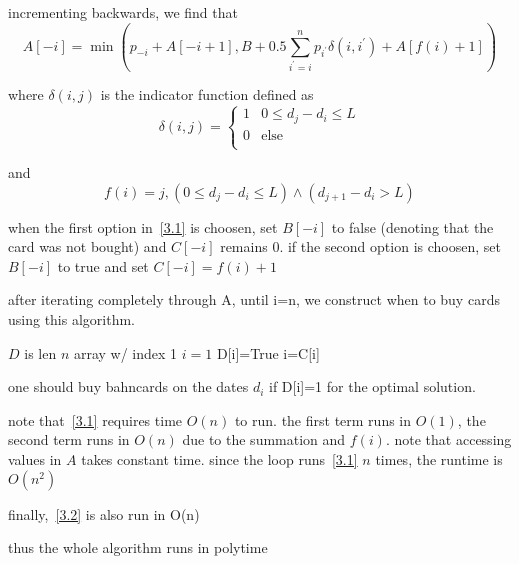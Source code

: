 \documentclass[letterpaper,12pt]{article}
\begin{document}
\begin{enumerate}
incrementing backwards, we find that 
\begin{equation}\label{3.1}
    A[-i] = \min\left(p_{-i}+A[-i+1],B+0.5\sum_{i^\prime = i}^{n}p_{i^\prime}\delta(i,i^\prime)+A[f(i)+1]\right)
\end{equation}

where \(\delta(i,j)\) is the indicator function defined as
\begin{equation}
    \delta(i,j)=\begin{cases}
        1 &0\leq d_j-d_i\leq L\\
        0& \text{else}\\
    \end{cases}
\end{equation}

and
\begin{equation}
    f(i) = j, (0\leq d_j-d_i\leq L) \land (d_{j+1}-d_i>L)
\end{equation}

when the first option in~\ref{3.1} is choosen, set \(B[-i]\) to false (denoting that the card was not bought) and \(C[-i]\) remains 0. if the second option is choosen, set \(B[-i]\) to true and set \(C[-i]=f(i)+1\)


after iterating completely through A, until i=n, we construct when to buy cards using this algorithm.

\begin{algorithmic}[1]\label{3.2}
    \State \(D\) is len \(n\) array w/ index 1
    \State \(i=1\)
            \State D[i]=True
            \State i=C[i]
        \EndIf
    \EndWhile
\end{algorithmic}

one should buy bahncards on the dates \(d_i\) if D[i]=1 for the optimal solution.

note that~\ref{3.1} requires time \(O(n)\) to run. the first term runs in \(O(1)\), the second term runs in \(O(n)\) due to the summation and \(f(i)\). note that accessing values in \(A\) takes constant time. since the loop runs~\ref{3.1} \(n\) times, the runtime is \(O(n^2)\)

finally,~\ref{3.2} is also run in O(n)

thus the whole algorithm runs in polytime




\end{enumerate}
\end{document}
